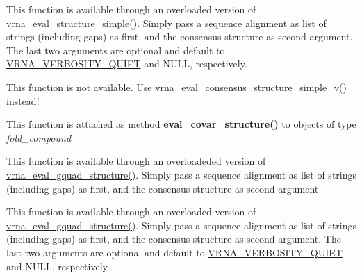 \begin{DoxyRefList}
\item[\label{wrappers__wrappers000049}%
\Hypertarget{wrappers__wrappers000049}%
Global \mbox{\hyperlink{group__eval_gad88927c62ab0a8b534e078e44be1b36e}{vrna\+\_\+eval\+\_\+consensus\+\_\+structure\+\_\+simple\+\_\+v}} (const char $\ast$$\ast$alignment, const char $\ast$structure, int verbosity\+\_\+level, F\+I\+LE $\ast$file)]This function is available through an overloaded version of \mbox{\hyperlink{group__eval_ga7e5273464b775d4130245681312c1369}{vrna\+\_\+eval\+\_\+structure\+\_\+simple()}}. Simply pass a sequence alignment as list of strings (including gaps) as first, and the consensus structure as second argument. The last two arguments are optional and default to \mbox{\hyperlink{eval_8h_af4afe19780b61b4962c613bde324128b}{V\+R\+N\+A\+\_\+\+V\+E\+R\+B\+O\+S\+I\+T\+Y\+\_\+\+Q\+U\+I\+ET}} and N\+U\+LL, respectively.  
\item[\label{wrappers__wrappers000044}%
\Hypertarget{wrappers__wrappers000044}%
Global \mbox{\hyperlink{group__eval_ga1c07851f6b665c3461a19e9e4eb33d26}{vrna\+\_\+eval\+\_\+consensus\+\_\+structure\+\_\+simple\+\_\+verbose}} (const char $\ast$$\ast$alignment, const char $\ast$structure, F\+I\+LE $\ast$file)]This function is not available. Use \mbox{\hyperlink{group__eval_gad88927c62ab0a8b534e078e44be1b36e}{vrna\+\_\+eval\+\_\+consensus\+\_\+structure\+\_\+simple\+\_\+v()}} instead!  
\item[\label{wrappers__wrappers000029}%
\Hypertarget{wrappers__wrappers000029}%
Global \mbox{\hyperlink{group__eval_ga6cea75c0eb9857fb59172be54cab09e0}{vrna\+\_\+eval\+\_\+covar\+\_\+structure}} (vrna\+\_\+fold\+\_\+compound\+\_\+t $\ast$vc, const char $\ast$structure)]This function is attached as method {\bfseries eval\+\_\+covar\+\_\+structure()} to objects of type {\itshape fold\+\_\+compound}  
\item[\label{wrappers__wrappers000041}%
\Hypertarget{wrappers__wrappers000041}%
Global \mbox{\hyperlink{group__eval_gaf09a326b3d57a4b30c27bd0e216198ac}{vrna\+\_\+eval\+\_\+gquad\+\_\+consensus\+\_\+structure}} (const char $\ast$$\ast$alignment, const char $\ast$structure)]This function is available through an overloadeded version of \mbox{\hyperlink{group__eval_ga3263504825ef4b523eba797c99921df4}{vrna\+\_\+eval\+\_\+gquad\+\_\+structure()}}. Simply pass a sequence alignment as list of strings (including gaps) as first, and the consensus structure as second argument  
\item[\label{wrappers__wrappers000051}%
\Hypertarget{wrappers__wrappers000051}%
Global \mbox{\hyperlink{group__eval_ga8abc794fc48d43268ced5e8cde017baa}{vrna\+\_\+eval\+\_\+gquad\+\_\+consensus\+\_\+structure\+\_\+v}} (const char $\ast$$\ast$alignment, const char $\ast$structure, int verbosity\+\_\+level, F\+I\+LE $\ast$file)]This function is available through an overloaded version of \mbox{\hyperlink{group__eval_ga3263504825ef4b523eba797c99921df4}{vrna\+\_\+eval\+\_\+gquad\+\_\+structure()}}. Simply pass a sequence alignment as list of strings (including gaps) as first, and the consensus structure as second argument. The last two arguments are optional and default to \mbox{\hyperlink{eval_8h_af4afe19780b61b4962c613bde324128b}{V\+R\+N\+A\+\_\+\+V\+E\+R\+B\+O\+S\+I\+T\+Y\+\_\+\+Q\+U\+I\+ET}} and N\+U\+LL, respectively.  

\end{DoxyRefList}
